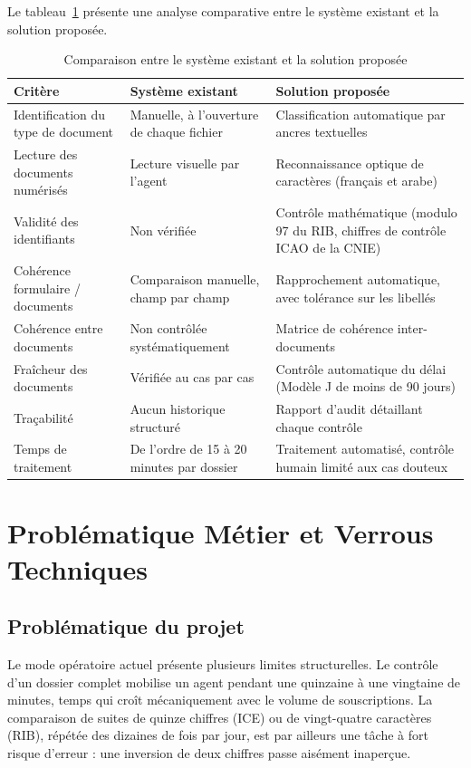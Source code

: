 Le tableau~\ref{tab:comparaison} présente une analyse comparative entre le système
existant et la solution proposée.

\begin{table}[H]
\centering
\caption{Comparaison entre le système existant et la solution proposée}
\label{tab:comparaison}
\small
\begin{tabular}{|p{3.2cm}|p{4.6cm}|p{4.6cm}|}
\hline
\textbf{Critère} & \textbf{Système existant} & \textbf{Solution proposée} \\
\hline
Identification du type de document & Manuelle, à l'ouverture de chaque fichier &
Classification automatique par ancres textuelles \\
\hline
Lecture des documents numérisés & Lecture visuelle par l'agent &
Reconnaissance optique de caractères (français et arabe) \\
\hline
Validité des identifiants & Non vérifiée &
Contrôle mathématique (modulo 97 du RIB, chiffres de contrôle ICAO de la CNIE) \\
\hline
Cohérence formulaire / documents & Comparaison manuelle, champ par champ &
Rapprochement automatique, avec tolérance sur les libellés \\
\hline
Cohérence entre documents & Non contrôlée systématiquement &
Matrice de cohérence inter-documents \\
\hline
Fraîcheur des documents & Vérifiée au cas par cas &
Contrôle automatique du délai (Modèle J de moins de 90 jours) \\
\hline
Traçabilité & Aucun historique structuré &
Rapport d'audit détaillant chaque contrôle \\
\hline
Temps de traitement & De l'ordre de 15 à 20 minutes par dossier &
Traitement automatisé, contrôle humain limité aux cas douteux \\
\hline
\end{tabular}
\end{table}

\section{Probl\'{e}matique M\'{e}tier et Verrous Techniques}
\subsection{Problématique du projet}
Le mode opératoire actuel présente plusieurs limites structurelles. Le contrôle
d'un dossier complet mobilise un agent pendant une quinzaine à une vingtaine de
minutes, temps qui croît mécaniquement avec le volume de souscriptions. La
comparaison de suites de quinze chiffres (ICE) ou de vingt-quatre caractères
(RIB), répétée des dizaines de fois par jour, est par ailleurs une tâche à fort
risque d'erreur : une inversion de deux chiffres passe aisément inaperçue.

